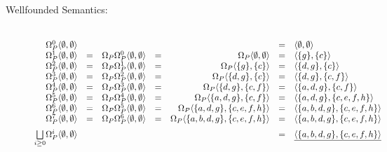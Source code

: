 \begin{Loesung}
\begin{UList}
\begin{description}
\item[Wellfounded Semantics:] ~\\
\hspace*{-6mm}
  \(
  \begin{array}{@{}rcrcrcl}
    \Wi{0}{\Pi}{\emptyset,\emptyset} & & & & & = &
    \langle\emptyset,\emptyset\rangle \\
    \Wi{1}{\Pi}{\emptyset,\emptyset} & = & 
    \WiPi{\Pi}\Wi{0}{\Pi}{\emptyset,\emptyset} & = &
    \WiO{\Pi}{\emptyset,\emptyset} & = & 
    \langle\{g\},\{c\}\rangle \\
    \Wi{2}{\Pi}{\emptyset,\emptyset} & = & 
    \WiPi{\Pi}\Wi{1}{\Pi}{\emptyset,\emptyset} & = &
    \WiO{\Pi}{\{g\},\{c\}} & = & 
    \langle\{d,g\},\{c\}\rangle \\
    \Wi{3}{\Pi}{\emptyset,\emptyset} & = & 
    \WiPi{\Pi}\Wi{2}{\Pi}{\emptyset,\emptyset} & = &
    \WiO{\Pi}{\{d,g\},\{c\}} & = & 
    \langle\{d,g\},\{c,f\}\rangle \\
    \Wi{4}{\Pi}{\emptyset,\emptyset} & = & 
    \WiPi{\Pi}\Wi{3}{\Pi}{\emptyset,\emptyset} & = &
    \WiO{\Pi}{\{d,g\},\{c,f\}} & = & 
    \langle\{a,d,g\},\{c,f\}\rangle \\
    \Wi{5}{\Pi}{\emptyset,\emptyset} & = & 
    \WiPi{\Pi}\Wi{4}{\Pi}{\emptyset,\emptyset} & = &
    \WiO{\Pi}{\{a,d,g\},\{c,f\}} & = & 
    \langle\{a,d,g\},\{c,e,f,h\}\rangle \\
    \Wi{6}{\Pi}{\emptyset,\emptyset} & = & 
    \WiPi{\Pi}\Wi{5}{\Pi}{\emptyset,\emptyset} & = &
    \WiO{\Pi}{\{a,d,g\},\{c,e,f,h\}} & = & 
    \langle\{a,b,d,g\},\{c,e,f,h\}\rangle \\
    \Wi{7}{\Pi}{\emptyset,\emptyset} & = & 
    \WiPi{\Pi}\Wi{6}{\Pi}{\emptyset,\emptyset} & = &
    \WiO{\Pi}{\{a,b,d,g\},\{c,e,f,h\}} & = & 
    \langle\{a,b,d,g\},\{c,e,f,h\}\rangle \\[2mm]
    \underset{i\geq 0}{\bigsqcup}\Wi{i}{\Pi}{\emptyset,\emptyset} 
    & & & & & = & \underline{\langle\{a,b,d,g\},\{c,e,f,h\}\rangle}
  \end{array}
  \)
%

\end{description}
\end{UList}
\end{Loesung}
